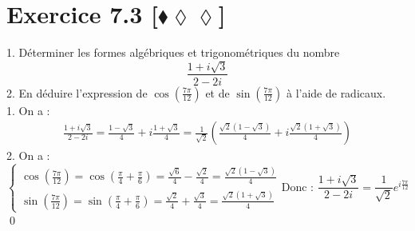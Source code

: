 \documentclass[10pt]{article}
\begin{document}
\section*{Exercice 7.3 [$\blacklozenge\lozenge\lozenge$]}
\begin{tcolorbox}[enhanced, width=7in, center, size=fbox, fontupper=\large, drop shadow southwest]
    1. Déterminer les formes algébriques et trigonométriques du nombre
    \begin{equation*}
        \frac{1+i\sqrt{3}}{2-2i}
    \end{equation*}
    2. En déduire l'expression de $\cos(\frac{7\pi}{12})$ et de $\sin(\frac{7\pi}{12})$ à l'aide de radicaux.\\[0.25cm]
    1. On a :
    \begin{align*}
        \frac{1+i\sqrt{3}}{2-2i}=\frac{1-\sqrt{3}}{4}+i\frac{1+\sqrt{3}}{4}=\frac{1}{\sqrt{2}}\left(\frac{\sqrt{2}(1-\sqrt{3})}{4}+i\frac{\sqrt{2}(1+\sqrt{3})}{4}\right)
    \end{align*}
    2. On a :
    \begin{equation*}
        \begin{cases}
            \cos(\frac{7\pi}{12})=\cos(\frac{\pi}{4}+\frac{\pi}{6})=\frac{\sqrt{6}}{4}-\frac{\sqrt{2}}{4}=\frac{\sqrt{2}(1-\sqrt{3})}{4}\\
            \sin(\frac{7\pi}{12})=\sin(\frac{\pi}{4}+\frac{\pi}{6})=\frac{\sqrt{2}}{4}+\frac{\sqrt{3}}{4}=\frac{\sqrt{2}(1+\sqrt{3})}{4}
        \end{cases}
        \text{Donc : }\frac{1+i\sqrt{3}}{2-2i}=\frac{1}{\sqrt{2}}e^{i\frac{7\pi}{12}}
    \end{equation*}
    \qed
\end{tcolorbox}

\end{document}
